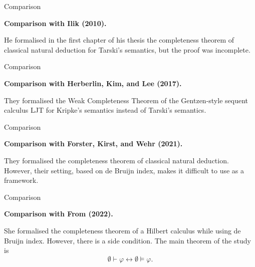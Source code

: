\documentclass[serif,table,10pt]{beamer}
\newcommand{\0}{\texttt{0}}
\newcommand{\1}{\texttt{1}}
\begin{document}
\begin{frame}{Comparison}

    \textbf{Comparison with Ilik (2010).}

    He formalised in the first chapter of his thesis the completeness theorem of classical natural deduction for Tarski's semantics, but the proof was incomplete.

\end{frame}

\begin{frame}{Comparison}

   \textbf{Comparison with Herberlin, Kim, and Lee (2017).}

   They formalised the Weak Completeness Theorem of the Gentzen-style sequent calculus LJT for Kripke's semantics instead of Tarski's semantics.

\end{frame}

\begin{frame}{Comparison}

    \textbf{Comparison with Forster, Kirst, and Wehr (2021).}

    They formalised the completeness theorem of classical natural deduction. However, their setting, based on de Bruijn index, makes it difficult to use as a framework.

\end{frame}

\begin{frame}{Comparison}

    \textbf{Comparison with From (2022).}

    She formalised the completeness theorem of a Hilbert calculus while using de Bruijn index. However, there is a side condition.
    The main theorem of the study is \[ \emptyset \vdash \varphi \leftrightarrow \emptyset \vDash \varphi . \]

\end{frame}
\end{document}

